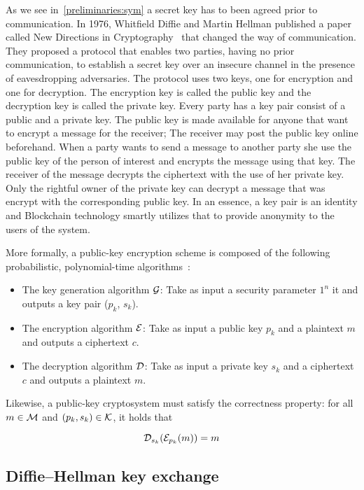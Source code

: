As we see in~\ref{preliminaries:sym} a secret key has to been agreed prior to communication. In 1976, Whitfield Diffie and Martin Hellman published a paper called New Directions in Cryptography~\cite{Diffie:2006:NDC:2263321.2269104} that changed the way of communication. They proposed a protocol that enables two parties, having no prior communication, to establish a secret key over an insecure channel in the presence of eavesdropping adversaries. The protocol uses two keys, one for encryption and one for decryption. The encryption key is called the public key and the decryption key is called the private key. Every party has a key pair consist of a public and a private key. The public key is made available for anyone that want to encrypt a message for the receiver; The receiver may post the public key online beforehand. When a party wants to send a message to another party she use the public key of the person of interest and encrypts the message using that key. The receiver of the message decrypts the ciphertext with the use of her private key. Only the rightful owner of the private key can decrypt a message that was encrypt with the corresponding public key. In an essence, a key pair is an identity and Blockchain technology smartly utilizes that to provide anonymity to the users of the system.

More formally, a public-key encryption scheme is composed of the following probabilistic, polynomial-time algorithms~\cite{Katz:2014:IMC:2700550, kiagias:crypto}:

\begin{itemize}
  \item The key generation algorithm $\mathcal{G}$: Take as input a security parameter $1^{n}$ it and outputs a key pair ($p_k$, $s_k$).
  \item The encryption algorithm $\mathcal{E}$: Take as input a public key $p_k$ and a plaintext $m$ and outputs a ciphertext $c$.
  \item The decryption algorithm $\mathcal{D}$: Take as input a private key $s_k$ and a ciphertext $c$ and outputs a plaintext $m$.
\end{itemize}

Likewise, a public-key cryptosystem must satisfy the correctness property: for all $m \in \mathcal{M}$ and $(p_k, s_k) \in \mathcal{K}$, it holds that

\begin{equation*}
  \mathcal{D}_{s_k}(\mathcal{E}_{p_k}(m)) = m
\end{equation*}

\subsection{Diffie–Hellman key exchange}
\label{preliminaries:pub:dh}

